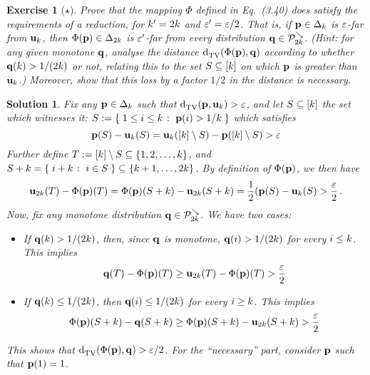 \documentclass[biber]{nowfnt} %
\newtheorem{question}{Exercise}[chapter]
\newtheorem{solution}{Solution}[chapter]
\begin{document}
\begin{question}[$\star$]\label{ex:reduction:monotone}
  Prove that the mapping $\Phi$ defined in Eq.~(3.40) does satisfy the requirements of a reduction, for $k'=2k$ and $\varepsilon'=\varepsilon/2$. That is, if $\mathbf{p}\in\Delta_{k}$ is $\varepsilon$-far from $\mathbf{u}_k$, then $\Phi(\mathbf{p})\in\Delta_{2k}$ is $\varepsilon'$-far from every distribution $\mathbf{q}\in\mathcal{P}^{\searrow}_{2k}$. \textit{(Hint: for any given monotone $\mathbf{q}$, analyse the distance $\totalvardist{\Phi(\p)}{\q}$ according to whether $\mathbf{q}(k) > 1/(2k)$ or not, relating this to the set $S\subseteq[k]$ on which $\mathbf{p}$ is greater than $\mathbf{u}_k$.)} Moreover, show that this loss by a factor $1/2$ in the distance is necessary.
\end{question}
\begin{solution}
Fix any $\mathbf{p}\in\Delta_{k}$ such that $\totalvardist{\p}{\uniform_\ab}>\dst$, and let $S\subseteq [k]$ the set which witnesses it:
$S\eqdef \setOfSuchThat{ 1\leq i\leq \ab }{\p(i)> 1/\ab }$ 
which satisfies 
\[
	\mathbf{p}(S)-\mathbf{u}_k(S) = \mathbf{u}_k([k]\setminus S)- \mathbf{p}([k]\setminus S) >\varepsilon
\]
Further define $T := [k]\setminus S \subseteq \{1,2,\dots,k\}$, and $S+\ab = \setOfSuchThat{i+\ab}{i\in S} \subseteq \{\ab+1,\dots,2\ab\}$. 
By definition of $\Phi(\mathbf{p})$, we then have
\[
	\mathbf{u}_{2k}(T)-\Phi(\mathbf{p})(T)=\Phi(\mathbf{p})(S+k)-\mathbf{u}_{2k}(S+k)= \frac{1}{2}(\mathbf{p}(S)-\mathbf{u}_k(S)>\frac{\varepsilon}{2}\,.
\]
Now, fix any monotone distribution $\mathbf{q}\in\mathcal{P}^{\searrow}_{2k}$. We have two cases:
\begin{itemize}
\item If $\mathbf{q}(k) > 1/(2k)$, then, since $\mathbf{q}$ is monotone, $\mathbf{q}(i) > 1/(2k)$ for every $i \leq k$. This implies
\[
	\mathbf{q}(T)-\Phi(\mathbf{p})(T) \geq \mathbf{u}_{2k}(T)-\Phi(\mathbf{p})(T) > \frac{\varepsilon}{2}
\]
\item If $\mathbf{q}(k) \leq 1/(2k)$, then $\mathbf{q}(i) \leq 1/(2k)$ for every $i \geq k$. This implies
\[
	\Phi(\mathbf{p})(S+k)-\mathbf{q}(S+k) \geq \Phi(\mathbf{p})(S+k)-\mathbf{u}_{2k}(S+k) > \frac{\varepsilon}{2}
\]
\end{itemize}
This shows that $\totalvardist{\Phi(\p)}{\q} > \dst/2$. For the ``necessary'' part, consider $\mathbf{p}$ such that $\mathbf{p}(1)=1$.
\end{solution}
\end{document}
